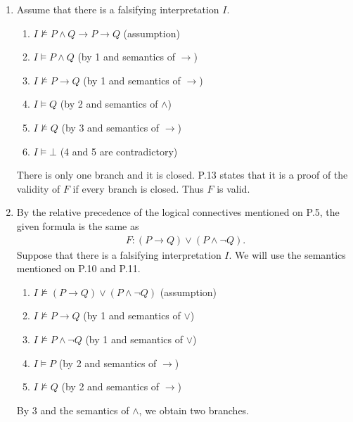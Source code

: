 
\begin{exer}[1.1]
    $ $
    \begin{enumerate}[label=(\alph*)]
        \item
            Assume that there is a falsifying interpretation $I$.
            \begin{enumerate}[label=\arabic*.]
                \item %
                    $I \not\models P \land Q \rightarrow P \rightarrow Q$ (assumption)
                \item %
                    $I \models P \land Q$ (by 1 and semantics of $\rightarrow$)
                \item %
                    $I \not\models P \rightarrow Q$ (by 1 and semantics of $\rightarrow$)
                \item %
                    $I \models Q$ (by 2 and semantics of $\land$)
                \item %
                    $I \not\models Q$ (by 3 and semantics of $\rightarrow$)
                \item %
                    $I \models \bot$ (4 and 5 are contradictory)
            \end{enumerate}
            There is only one branch and it is closed.
            P.13 states that it is a proof of the validity of $F$ if every branch is closed.
            Thus $F$ is valid.
        \item
            By the relative precedence of the logical connectives mentioned on P.5, the given formula is the same as
            \begin{align*}
                F: (P \rightarrow Q) \lor (P \land \neg Q).
            \end{align*}
            Suppose that there is a falsifying interpretation $I$.
            We will use the semantics mentioned on P.10 and P.11.
            \begin{enumerate}[label=\arabic*.]
                \item %
                    $I \not\models (P \rightarrow Q) \lor (P \land \neg Q)$ (assumption)
                \item %
                    $I \not\models P \rightarrow Q$ (by 1 and semantics of $\lor$)
                \item %
                    $I \not\models P \land \neg Q$ (by 1 and semantics of $\lor$)
                \item %
                    $I \models P$ (by 2 and semantics of $\rightarrow$)
                \item %
                    $I \not\models Q$ (by 2 and semantics of $\rightarrow$)
            \end{enumerate}
            By 3 and the semantics of $\land$, we obtain two branches.


\end{enumerate}
\end{exer}

